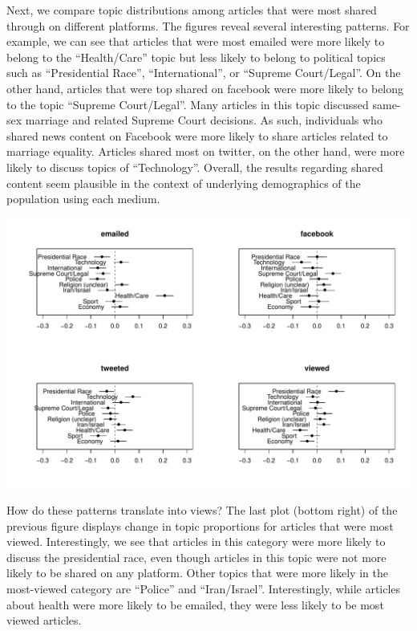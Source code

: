 \documentclass[12pt]{article}\usepackage[]{graphicx}\usepackage[]{color}
\makeatletter
\def\maxwidth{ %
  \ifdim\Gin@nat@width>\linewidth
    \linewidth
  \else
    \Gin@nat@width
  \fi
}
\newenvironment{knitrout}{}{} %
\makeatother
\begin{document}
Next, we compare topic distributions among articles that were most shared through on different platforms. The figures reveal several interesting patterns. For example, we can see that articles that were most emailed were more likely to belong to the ``Health/Care'' topic but less likely to belong to political topics such as ``Presidential Race'', ``International'', or ``Supreme Court/Legal''. On the other hand, articles that were top shared on facebook were more likely to belong to the topic ``Supreme Court/Legal''. Many articles in this topic discussed same-sex marriage and related Supreme Court decisions. As such, individuals who shared news content on Facebook were more likely to share articles related to marriage equality. Articles shared most on twitter, on the other hand, were more likely to discuss topics of ``Technology''. Overall, the results regarding shared content seem plausible in the context of underlying demographics of the population using each medium.

\begin{knitrout}
\color{fgcolor}
\includegraphics[width=\maxwidth]{figure/unnamed-chunk-8-1} 

\end{knitrout}

How do these patterns translate into views? The last plot (bottom right) of the previous figure displays change in topic proportions for articles that were most viewed. Interestingly, we see that articles in this category were more likely to discuss the presidential race, even though articles in this topic were not more likely to be shared on any platform. Other topics that were more likely in the most-viewed category are ``Police'' and ``Iran/Israel''. Interestingly, while articles about health were more likely to be emailed, they were less likely to be most viewed articles.
\end{document}
